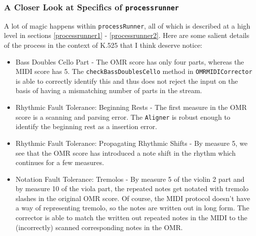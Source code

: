 \subsubsection{A Closer Look at Specifics of \texttt{processrunner}}
A lot of magic happens within \texttt{processRunner}, all of which is described at a high level in sections \ref{processrunner1} - \ref{processrunner2}. Here are some salient details of the process in the context of K.525 that I think deserve notice:
\begin{itemize}
\item Bass Doubles Cello Part - The OMR score has only four parts, whereas the MIDI score has 5. The \texttt{checkBassDoublesCello} method in \texttt{OMRMIDICorrector} is able to correctly identify this and thus does not reject the input on the basis of having a mismatching number of parts in the stream. 
\item Rhythmic Fault Tolerance: Beginning Rests - The first measure in the OMR score is a scanning and parsing error. The \texttt{Aligner} is robust enough to identify the beginning rest as a insertion error. 
\item Rhythmic Fault Tolerance: Propagating Rhythmic Shifts - By measure 5, we see that the OMR score has introduced a  note shift in the rhythm which continues for a few measures. 
\item Notation Fault Tolerance: Tremolos - By measure 5 of the violin 2 part and by measure 10 of the viola part, the repeated  notes get notated with tremolo slashes in the original OMR score. Of course, the MIDI protocol doesn't have a way of representing tremolo, so the notes are written out in long form. The corrector is able to match the written out repeated notes in the MIDI to the (incorrectly) scanned corresponding notes in the OMR. 
\end{itemize}


